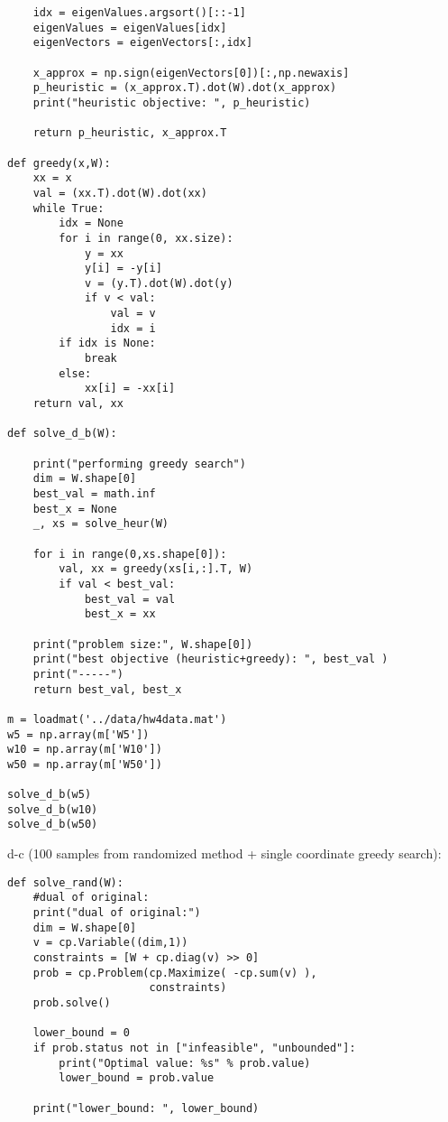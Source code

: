\documentclass[12pt,letter]{article}
\begin{document}
\begin{enumerate}
\begin{enumerate}
\begin{itemize}
\begin{verbatim}
    idx = eigenValues.argsort()[::-1]
    eigenValues = eigenValues[idx]
    eigenVectors = eigenVectors[:,idx]
    
    x_approx = np.sign(eigenVectors[0])[:,np.newaxis]
    p_heuristic = (x_approx.T).dot(W).dot(x_approx)
    print("heuristic objective: ", p_heuristic)

    return p_heuristic, x_approx.T
    
def greedy(x,W):
    xx = x
    val = (xx.T).dot(W).dot(xx)
    while True:
        idx = None
        for i in range(0, xx.size):
            y = xx
            y[i] = -y[i]
            v = (y.T).dot(W).dot(y)
            if v < val:
                val = v
                idx = i
        if idx is None:
            break
        else:
            xx[i] = -xx[i]
    return val, xx

def solve_d_b(W):
    
    print("performing greedy search")
    dim = W.shape[0]
    best_val = math.inf
    best_x = None
    _, xs = solve_heur(W)
    
    for i in range(0,xs.shape[0]):
        val, xx = greedy(xs[i,:].T, W)
        if val < best_val:
            best_val = val
            best_x = xx
            
    print("problem size:", W.shape[0])
    print("best objective (heuristic+greedy): ", best_val )
    print("-----")
    return best_val, best_x

m = loadmat('../data/hw4data.mat')
w5 = np.array(m['W5'])
w10 = np.array(m['W10'])
w50 = np.array(m['W50'])

solve_d_b(w5)
solve_d_b(w10)
solve_d_b(w50)
\end{verbatim}
      
      \pagebreak
      
      d-c (100 samples from randomized method + single coordinate greedy search):

\begin{verbatim}
def solve_rand(W):  
    #dual of original:
    print("dual of original:")
    dim = W.shape[0]
    v = cp.Variable((dim,1))
    constraints = [W + cp.diag(v) >> 0]
    prob = cp.Problem(cp.Maximize( -cp.sum(v) ),
                      constraints)
    prob.solve()
    
    lower_bound = 0
    if prob.status not in ["infeasible", "unbounded"]:
        print("Optimal value: %s" % prob.value)
        lower_bound = prob.value

    print("lower_bound: ", lower_bound)


\end{verbatim}
\end{itemize}
\end{enumerate}
\end{enumerate}
\end{document}
